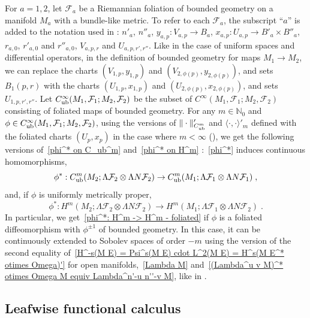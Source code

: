 \documentclass{memo-l}
\theoremstyle{plain}
\theoremstyle{definition}
\theoremstyle{remark}
\newcommand{\N}{\mathbb{N}}
\newcommand{\FF}{\mathcal{F}}
\newcommand{\Cinftyub}{C^\infty_{\text{\rm ub}}}
\numberwithin{section}{chapter}
\numberwithin{equation}{section}%
\begin{document}
For $a=1,2$, let $\FF_a$ be a Riemannian foliation of bounded geometry on a manifold $M_a$ with a bundle-like metric. To refer to each $\FF_a$, the subscript ``$a$'' is added to the notation used in : $n'_a$, $n''_a$, $y_{a,p}:V_{a,p}\to B_a$, $x_{a,p}:U_{a,p}\to B'_a\times B''_a$, $r_{a,0}$, $r'_{a,0}$ and $r''_{a,0}$, $V_{a,p,r}$ and $U_{a,p,r',r''}$. Like in the case of uniform spaces and differential operators, in the definition of bounded geometry for maps $M_1\to M_2$, we can replace the charts  $(V_{1,p},y_{1,p})$ and $(V_{2,\phi(p)},y_{2,\phi(p)})$, and sets $B_1(p,r)$ with the charts $(U_{1,p},x_{1,p})$ and $(U_{2,\phi(p)},x_{2,\phi(p)})$, and sets $U_{1,p,r',r''}$. Let $\Cinftyub(M_1,\FF_1;M_2,\FF_2)$ be the subset of $C^\infty(M_1,\FF_1;M_2,\FF_2)$ consisting of foliated maps of bounded geometry. For any $m\in\N_0$ and $\phi\in \Cinftyub(M_1,\FF_1;M_2,\FF_2)$, using the versions of $\|\cdot\|'_{C^m_{\text{\rm ub}}}$ and $\langle\cdot,\cdot\rangle'_m$ defined with the foliated charts $(U_p,x_p)$ in the case where $m<\infty$ (), we get the following versions of~\eqref{phi^* on C_ub^m} and~\eqref{phi^* on H^m} \cite[Section~8]{AlvKordyLeichtnam2020}:~\eqref{phi^*} induces continuous homomorphisms,
\begin{equation}\label{phi^*: C_ub^m -> C_ub^m - foliated}
\phi^*:C_{\text{\rm ub}}^m(M_2;\Lambda\FF_2\otimes\Lambda N\FF_2)\to 
C_{\text{\rm ub}}^m(M_1;\Lambda\FF_1\otimes\Lambda N\FF_1)\;,
\end{equation}
and, if $\phi$ is uniformly metrically proper,     
\begin{equation}\label{phi^*: H^m -> H^m - foliated}
\phi^*:H^m(M_2;\Lambda\FF_2\otimes\Lambda N\FF_2)\to H^m(M_1;\Lambda\FF_1\otimes\Lambda N\FF_2)\;.
\end{equation}
In particular, we get~\eqref{phi^*: H^m -> H^m - foliated} if $\phi$ is a foliated diffeomorphism with $\phi^{\pm1}$ of bounded geometry. In this case, it can be continuously extended to Sobolev spaces of order $-m$ using the version of the second equality of~\eqref{H^-s(M E) = Psi^s(M E) cdot L^2(M E) = H^s(M E^* otimes Omega)'} for open manifolds,~\eqref{Lambda M} and~\eqref{(Lambda^u v M)^* otimes Omega M equiv Lambda^n'-u n''-v M}, like in .



\subsection{Leafwise functional calculus}\label{ss: Leafwise functional calculus}
\end{document}
